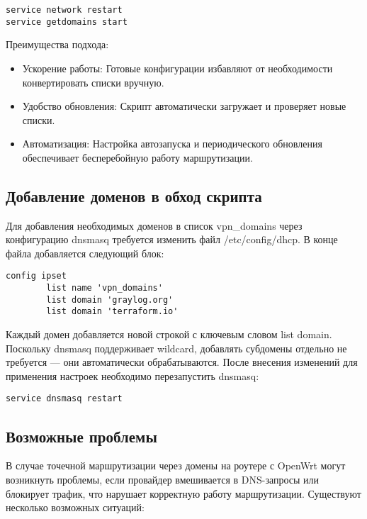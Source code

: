\begin{lstlisting}[frame=rlbt]
service network restart
service getdomains start
\end{lstlisting}

Преимущества подхода:

\begin{itemize}
    \item Ускорение работы: Готовые конфигурации избавляют от необходимости конвертировать списки вручную.
    \item Удобство обновления: Скрипт автоматически загружает и проверяет новые списки.
    \item Автоматизация: Настройка автозапуска и периодического обновления обеспечивает бесперебойную работу маршрутизации.
\end{itemize}

\subsection{Добавление доменов в обход скрипта}

Для добавления необходимых доменов в список vpn\_domains через конфигурацию dnsmasq требуется изменить файл /etc/config/dhcp. В конце файла добавляется следующий блок:

\begin{lstlisting}[frame=rlbt]
config ipset
        list name 'vpn_domains'
        list domain 'graylog.org'
        list domain 'terraform.io'
\end{lstlisting}

Каждый домен добавляется новой строкой с ключевым словом list domain. Поскольку dnsmasq поддерживает wildcard, добавлять субдомены отдельно не требуется — они автоматически обрабатываются. После внесения изменений для применения настроек необходимо перезапустить dnsmasq:

\begin{lstlisting}[frame=rlbt]
service dnsmasq restart
\end{lstlisting}

\subsection{Возможные проблемы}

В случае точечной маршрутизации через домены на роутере с OpenWrt могут возникнуть проблемы, если провайдер вмешивается в DNS-запросы или блокирует трафик, что нарушает корректную работу маршрутизации. Существуют несколько возможных ситуаций:

